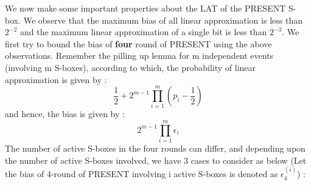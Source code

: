\documentclass[preprint]{transcrypto}
\begin{document}
We now make some important properties about the LAT of the PRESENT S-box. We observe that the maximum bias of all linear approximation is less than $2^{-2}$ and the maximum linear approximation of a single bit is less than $2^{-3}$. We first try to bound the bias of \textbf{four} round of PRESENT using the above observations. Remember the pilling up lemma for m independent events (involving m S-boxes), according to which, the probability of linear approximation is given by :
\begin{equation*}
    \frac{1}{2} + 2^{m-1} \prod_{i=1}^{m} \left( p_i  - \frac{1}{2} \right)
\end{equation*}
and hence, the bias is given by : 
\begin{equation*}
   2^{m-1}\prod_{i=1}^{m} \epsilon_i
\end{equation*}
The number of active S-boxes in the four rounds can differ, and depending upon the number of active S-boxes involved, we have 3 cases to consider as below (Let the bias of 4-round of PRESENT involving i active S-boxes is denoted as $\epsilon_4^{(i)}$) : 
\end{document}
